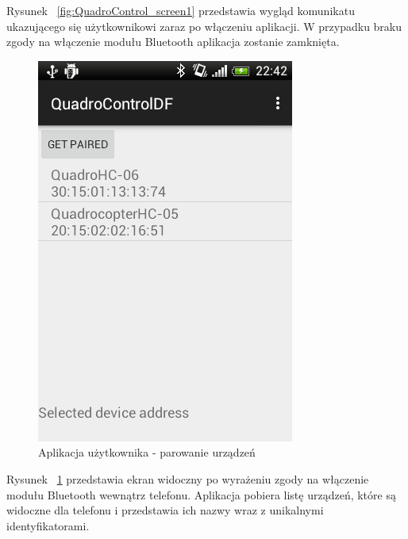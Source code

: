 Rysunek ~\ref{fig:QuadroControl_screen1} przedstawia wygląd komunikatu ukazującego się użytkownikowi zaraz po włączeniu aplikacji. W przypadku braku zgody na włączenie modułu Bluetooth aplikacja zostanie zamknięta.

\begin{figure}[H]
	\centering
	\includegraphics[scale=0.6]{Pictures/DroidAtScreen/droid@screen-2.png}
	\caption[Aplikacja użytkownika - parowanie urządzeń]{Aplikacja użytkownika - parowanie urządzeń}
	\label{fig:QuadroControl_screen2}
\end{figure}

Rysunek ~\ref{fig:QuadroControl_screen2} przedstawia ekran widoczny po wyrażeniu zgody na włączenie modułu Bluetooth wewnątrz telefonu. Aplikacja pobiera listę urządzeń, które są widoczne dla telefonu i przedstawia ich nazwy wraz z unikalnymi identyfikatorami. 

